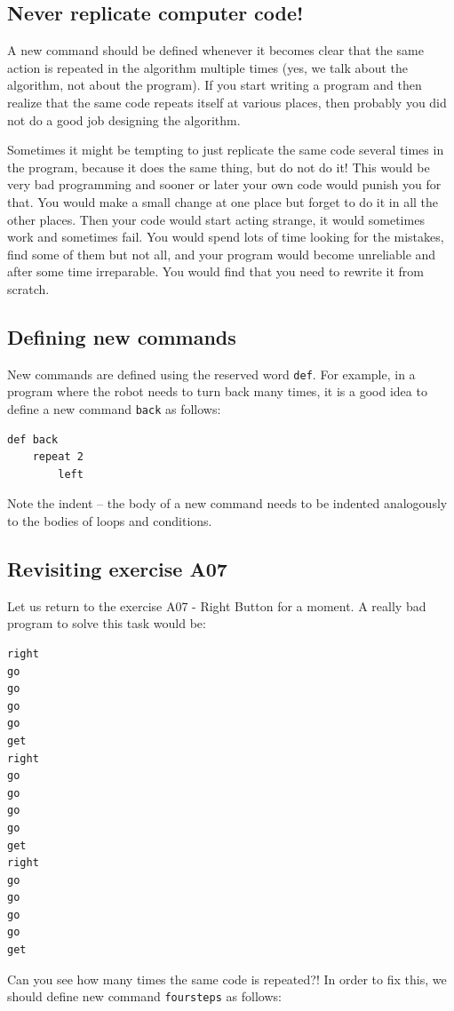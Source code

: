 \subsection{Never replicate computer code!}

A new command should be defined whenever it becomes clear that the same 
action is repeated in the algorithm multiple times (yes, we talk about the algorithm,
not about the program). If you start writing a program and then realize that the same
code repeats itself at various places, then probably you did not do a good job 
designing the algorithm.

Sometimes it might be 
tempting to just replicate the same code several times in the 
program, because it does the same thing, but do not do it! This would be very bad programming
and sooner or later your own code would punish you for that. 
You would make a small change at one place but forget to do it 
in all the other places. Then your code would start 
acting strange, it would sometimes work and sometimes fail. 
You would spend lots of time looking for the mistakes, find some 
of them but not all, and your program would become unreliable
and after some time irreparable. You would find that you need to 
rewrite it from scratch.

\subsection{Defining new commands}

New commands are defined using the reserved word 
{\tt def}. For example, in a program where the robot needs to turn back
many times, it is a good idea to define a new command {\tt back}
as follows:

\begin{verbatim}
def back
    repeat 2
        left
\end{verbatim}
Note the indent -- the body of a new command needs to be indented 
analogously to the bodies of loops and conditions.

\subsection{Revisiting exercise A07}

Let us return to the exercise A07 - Right Button for a moment.
A really bad program to solve this task would be:

{\small
\begin{verbatim}
right
go
go
go
go 
get
right
go
go
go
go 
get
right
go
go
go
go
get
\end{verbatim}
}
\noindent
Can you see how many times the same code is repeated?! In order to fix this, 
we should define new command {\tt foursteps} as
follows:


